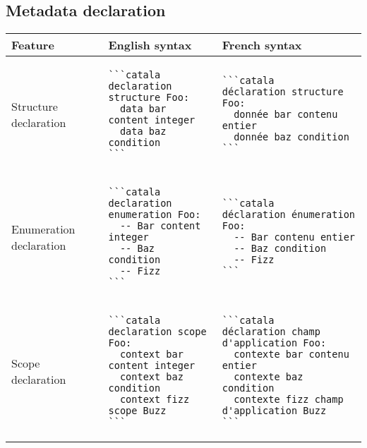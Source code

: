 \documentclass[a3paper,landscape]{article}
\begin{document}
\begin{multicols*}{2}
\section*{Metadata declaration}
\begin{tabular}{p{}p{}p{}}
\toprule
Feature&English syntax&French syntax\\\midrule
Structure declaration&
\vspace*{-1.7em}
\begin{verbatim}
```catala
declaration structure Foo:
  data bar content integer
  data baz condition
```
\end{verbatim}
\vspace*{-1.7em}
&
\vspace*{-1.7em}
\begin{verbatim}
```catala
déclaration structure Foo:
  donnée bar contenu entier
  donnée baz condition
```
\end{verbatim}
\vspace*{-1.7em}
\\
Enumeration declaration&
\vspace*{-1.7em}
\begin{verbatim}
```catala
declaration enumeration Foo:
  -- Bar content integer
  -- Baz condition
  -- Fizz
```
\end{verbatim}
\vspace*{-1.7em}
&
\vspace*{-1.7em}
\begin{verbatim}
```catala
déclaration énumeration Foo:
  -- Bar contenu entier
  -- Baz condition
  -- Fizz
```
\end{verbatim}
\vspace*{-1.7em}\\
Scope declaration&
\vspace*{-1.7em}
\begin{verbatim}
```catala
declaration scope Foo:
  context bar content integer
  context baz condition
  context fizz scope Buzz
```
\end{verbatim}
\vspace*{-1.7em}
&
\vspace*{-1.7em}
\begin{verbatim}
```catala
déclaration champ d'application Foo:
  contexte bar contenu entier
  contexte baz condition
  contexte fizz champ d'application Buzz
```
\end{verbatim}
\vspace*{-1.7em}\\
\bottomrule
\end{tabular}












\end{multicols*}
\end{document}
